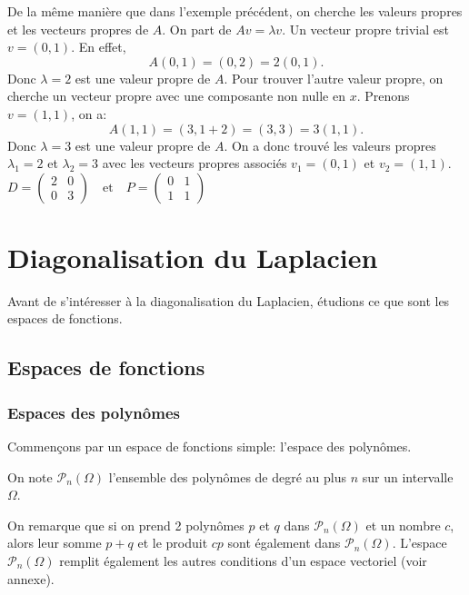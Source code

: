 \documentclass[11pt,a4paper]{article}
\numberwithin{equation}{section}
\theoremstyle{plain}
\theoremstyle{definition}
\theoremstyle{remark}
\begin{document}
\begin{solution}
    De la même manière que dans l'exemple précédent, on cherche les valeurs propres et les vecteurs propres de \(A\).
    On part de $A v = \lambda v$. Un vecteur propre trivial est $v = (0, 1)$.
    En effet,
    \[
        A(0, 1) = (0, 2) = 2(0, 1).
    \]
    Donc $\lambda = 2$ est une valeur propre de $A$.
    Pour trouver l'autre valeur propre, on cherche un vecteur propre avec une composante non nulle en $x$.
    Prenons $v = (1, 1)$, on a:
    \[
        A(1, 1) = (3, 1 + 2) = (3, 3) = 3(1, 1).
    \]
    Donc $\lambda = 3$ est une valeur propre de $A$.
    On a donc trouvé les valeurs propres $\lambda_1 = 2$ et $\lambda_2 = 3$ avec les vecteurs propres associés $v_1 = (0, 1)$ et $v_2 = (1, 1)$.
    \(
        D = \begin{pmatrix}
            2 & 0 \\
            0 & 3
        \end{pmatrix}
        \quad \text{et} \quad
        P = \begin{pmatrix}
            0 & 1 \\
            1 & 1
        \end{pmatrix}
    \)
\end{solution}



\section{Diagonalisation du Laplacien}

Avant de s'intéresser à la diagonalisation du Laplacien, étudions ce que sont les espaces de fonctions.

\subsection{Espaces de fonctions}

\subsubsection{Espaces des polynômes}

Commençons par un espace de fonctions simple: l'espace des polynômes.

On note $\mathcal{P}_n(\Omega)$ l'ensemble des polynômes de degré au plus \(n\) sur un intervalle \(\Omega\).

On remarque que si on prend 2 polynômes \(p\) et \(q\) dans \(\mathcal{P}_n(\Omega)\) et un nombre \(c\), alors leur somme \(p + q\) et le produit \(c p\) sont également dans \(\mathcal{P}_n(\Omega)\).
L'espace \(\mathcal{P}_n(\Omega)\) remplit également les autres conditions d'un espace vectoriel (voir annexe).
\end{document}
